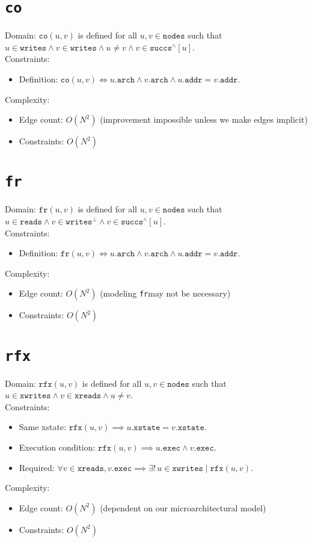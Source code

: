 \documentclass{article}
\newcommand{\succs}{\texttt{succs}}
\newcommand{\nodes}{\texttt{nodes}}
\newcommand{\arch}{\texttt{arch}}
\newcommand{\exec}{\texttt{exec}}
\newcommand{\addr}{\texttt{addr}}
\newcommand{\co}{\texttt{co}}
\newcommand{\fr}{\texttt{fr}}
\newcommand{\rfx}{\texttt{rfx}}
\newcommand{\closure}[1]{#1^\wedge}
\newcommand{\writes}{\texttt{writes}}
\newcommand{\reads}{\texttt{reads}}
\newcommand{\xwrites}{\texttt{xwrites}}
\newcommand{\xreads}{\texttt{xreads}}
\newcommand{\xstate}{\texttt{xstate}}
\begin{document}
\section{\co}
Domain: $\co(u,v)$ is defined for all $u,v \in \nodes$ such that $u \in \writes \wedge v \in \writes \wedge u \neq v \wedge v \in \closure{\succs}[u]$.
\\
Constraints:
\begin{itemize}
\item Definition: $\co(u,v) \iff u.\arch \wedge v.\arch \wedge u.\addr = v.\addr$.
\end{itemize}
Complexity:
\begin{itemize}
\item Edge count: $O(N^2)$ (improvement impossible unless we make edges implicit)
\item Constraints: $O(N^2)$
\end{itemize}


\section{\fr}
Domain: $\fr(u,v)$ is defined for all $u,v \in \nodes$ such that $u \in \reads \wedge v \in \writes^\bot \wedge v \in \closure{\succs}[u]$.
\\
Constraints:
\begin{itemize}
\item Definition: $\fr(u,v) \iff u.\arch \wedge v.\arch \wedge u.\addr = v.\addr$.
\end{itemize}
Complexity:
\begin{itemize}
\item Edge count: $O(N^2)$ (modeling \fr may not be necessary)
\item Constraints: $O(N^2)$
\end{itemize}


\section{\rfx}
Domain: $\rfx(u,v)$ is defined for all $u,v \in \nodes$ such that $u \in \xwrites \wedge v \in \xreads \wedge u \neq v$.
\\
Constraints:
\begin{itemize}
\item Same xstate: $\rfx(u,v) \implies u.\xstate = v.\xstate$.
\item Execution condition: $\rfx(u,v) \implies u.\exec \wedge v.\exec$.
\item Required: $\forall v \in \xreads, v.\exec \implies \exists!\,u \in \xwrites \mid
  \rfx(u,v)$.
\end{itemize}
Complexity:
\begin{itemize}
\item Edge count: $O(N^2)$ (dependent on our microarchitectural model)
\item Constraints: $O(N^2)$
\end{itemize}
\end{document}

